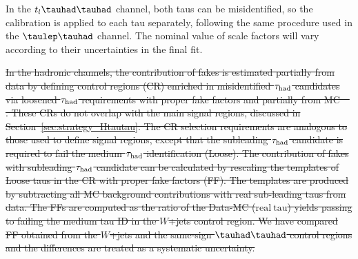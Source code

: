 \documentclass[PAPER, coverpage, atlasdraft=true, texlive=2016, UKenglish]{\ATLASLATEXPATH atlasdoc}
\providecommand{\DIFdel}[1]{{\protect\color{red}\sout{#1}}}                      %
\begin{document}
{In the $t_l\thadhad$ channel, both taus can be misidentified, so the calibration is applied to each tau separately, following the same procedure used in the $\tlhad$ channel.
The nominal value of scale factors will vary according to their uncertainties in the final fit.
}%

\DIFdel{In the hadronic channels, the contribution of fakes is estimated partially from data by defining control regions (CR)
enriched in misidentified
$\tau_{\mathrm{had}}$ candidates via loosened $\tau_{\mathrm{had}}$ requirements with proper fake factors and partially from MC~\mbox{%
\cite{ATLAS-CONF-2021-044}}\hspace{0pt}%
.
These CRs do not overlap with the main signal regions, discussed in Section~\ref{sec:strategy_Htautau}.
The CR selection requirements are analogous to those used to define signal regions, except
that the subleading $\tau_{\mathrm{had}}$ candidate is required to fail the medium $\tau_{\mathrm{had}}$ identification (Loose).
The contribution of fakes with subleading $\tau_{\mathrm{had}}$ candidate can be calculated by rescaling the templates of Loose taus in the CR
with proper fake factors (FF).
The templates are produced by subtracting all MC background contributions with real sub-leading taus from data.
The FFs are computed as
the ratio of the Data-MC ($\mathrm{real~tau}$) yields passing to failing the medium tau ID in the $W$+jets control region. We have compared
FF obtained from the $W$+jets and the same-sign $\thadhad$ control regions and the differences are treated as a systematic uncertainty.
}%

\end{document}
